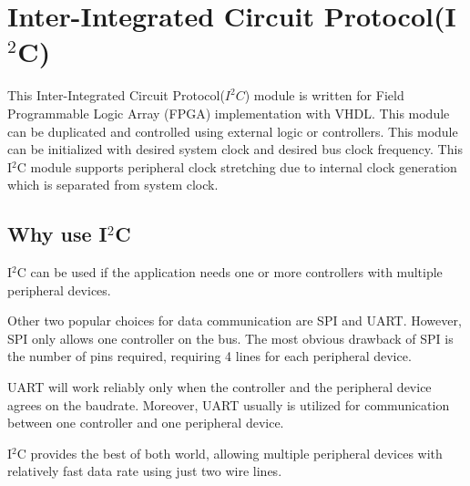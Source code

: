 \section{Inter-Integrated Circuit Protocol(I$^2$C)}
This Inter-Integrated Circuit Protocol($I^2C$) module is written for Field Programmable Logic Array (FPGA) implementation with VHDL. This module can be duplicated and controlled using external logic or controllers. This module can be initialized with desired system clock and desired bus clock frequency. This I$^2$C module supports peripheral clock stretching due to internal clock generation which is separated from system clock.
\subsection{Why use I$^2$C}
I$^2$C can be used if the application needs one or more controllers with multiple peripheral devices. 

Other two popular choices for data communication are SPI and UART. However, SPI only allows one controller on the bus. The most obvious drawback of SPI is the number of pins required, requiring 4 lines for each peripheral device. 

UART will work reliably only when the controller and the peripheral device agrees on the baudrate. Moreover, UART usually is utilized for communication between one controller and one peripheral device.

I$^2$C provides the best of both world, allowing multiple peripheral devices with relatively fast data rate using just two wire lines. \cite{whyI2c}

